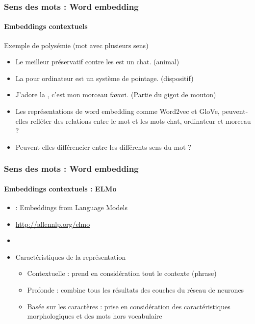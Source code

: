 \documentclass[xcolor=table]{beamer}
\begin{document}
\begin{frame}
\frametitle{Sens des mots : Word embedding}
\framesubtitle{Embeddings contextuels}

\begin{exampleblock}{Exemple de polysémie (mot avec plusieurs sens)}
	\begin{itemize}
		\item Le meilleur préservatif contre les  est un chat. (animal)
		\item La  pour ordinateur est un système de pointage. (dispositif)
		\item J'adore la , c'est mon morceau favori. (Partie du gigot de mouton)
	\end{itemize}
\end{exampleblock}

\begin{itemize}
	\item Les représentations de word embedding comme Word2vec et GloVe, peuvent-elles refléter des relations entre le mot  et les mots chat, ordinateur et morceau ?
	\item Peuvent-elles différencier entre les différents sens du mot  ?
\end{itemize}

\end{frame}

\begin{frame}
\frametitle{Sens des mots : Word embedding}
\framesubtitle{Embeddings contextuels : ELMo}

\begin{minipage}{.65\textwidth}
\begin{itemize}
	\item {} : Embeddings from Language Models
	\item \url{http://allennlp.org/elmo}
	\item \cite{2018-peters-al}
	\item Caractéristiques de la représentation
	\begin{itemize}
		\item Contextuelle :  prend en considération tout le contexte (phrase)
		\item Profonde : combine tous les résultats des couches du réseau de neurones
		\item Basée sur les caractères : prise en considération des caractéristiques morphologiques et des mots hors vocabulaire
	\end{itemize}
\end{itemize}
\end{minipage}
\begin{minipage}{.33\textwidth}
	\vspace{2cm}
\end{minipage}
	
\end{frame}
\end{document}
